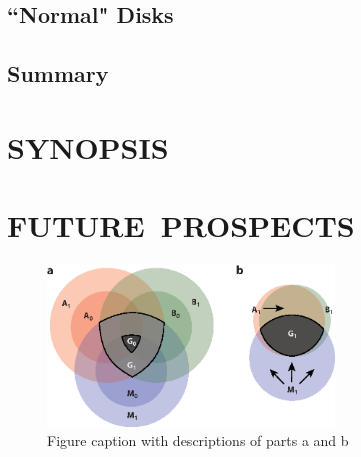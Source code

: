 \documentclass[a4paper]{ar-1col}
\begin{document}
\subsection{``Normal" Disks}

\subsection{Summary}


\section{SYNOPSIS} \label{sec:summary}



\section{FUTURE\ PROSPECTS} \label{sec:future}



\begin{figure}[h]
\includegraphics[width=3in]{SampleFigure}
\caption{Figure caption with descriptions of parts a and b}
\label{fig1}
\end{figure}

\end{document}
